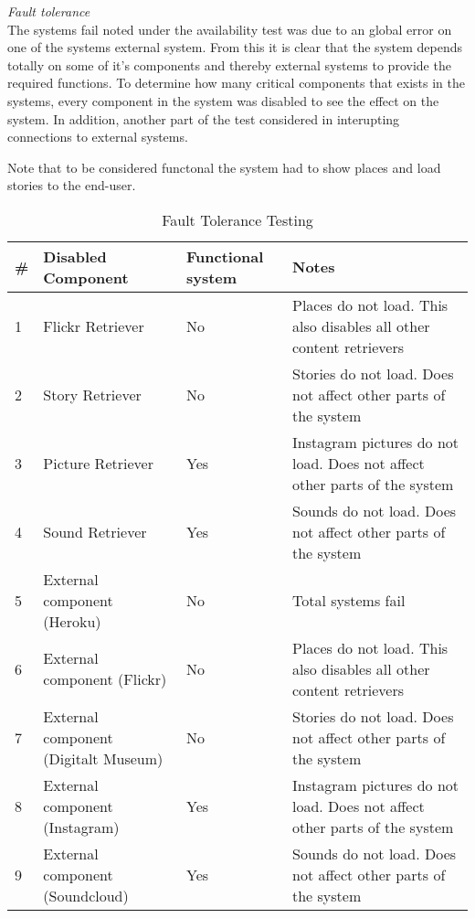 \emph{Fault tolerance}\\
The systems fail noted under the availability test was due to an global error on one of the systems external system. From this it is clear that the system depends totally on some of it's components and thereby external systems to provide the required functions. To determine how many critical components that exists in the systems, every component in the system was disabled to see the effect on the system. In addition, another part of the test considered in interupting connections to external systems. 

Note that to be considered functonal the system had to show places and load stories to the end-user. 

\begin{table}[!htp]
\begin{center}
	\begin{tabular}{ | l | p{4.2cm} | l | p{6.5cm} | }
	\hline
	\#	&Disabled Component	&Functional system	& Notes \\ \hline
	1	&Flickr Retriever		&No			& Places do not load. This also disables all other content retrievers\\ \hline
	2	&Story Retriever		&No			& Stories do not load. Does not affect other parts of the system\\ \hline
	3	&Picture Retriever	&Yes			& Instagram pictures do not load. Does not affect other parts of the system\\ \hline
	4	&Sound Retriever	&Yes			& Sounds do not load. Does not affect other parts of the system\\ \hline
	5	&External component (Heroku)	&No			& Total systems fail\\ \hline
	6	&External component (Flickr)	&No			& Places do not load. This also disables all other content retrievers\\ \hline
	7	&External component (Digitalt Museum)	&No		& Stories do not load. Does not affect other parts of the system\\ \hline
	8	&External component (Instagram)	&Yes			& Instagram pictures do not load. Does not affect other parts of the system\\ \hline
	9	&External component (Soundcloud)	&Yes			& Sounds do not load. Does not affect other parts of the system\\ 
	 \hline
	 \end{tabular}
\end{center}
\caption{Fault Tolerance Testing}
\label{tab:Fault Tolerance Testing}
\end{table}

